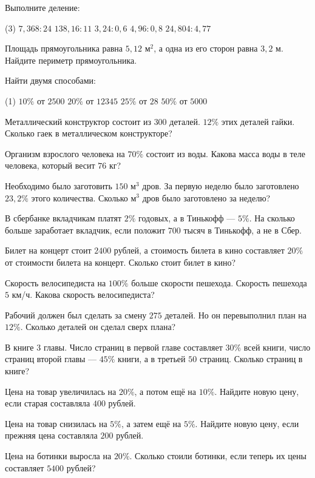 \begin{class}[number=3]
	\begin{listofex}
		\item Выполните деление:
		\begin{tasks}(3)
			\task \( 7,368: 24 \)
			\task \( 138,16:11 \) 
			\task \( 3,24:0,6 \)
			\task \( 4,96 : 0,8 \)
			\task \( 24,804 : 4,77 \) 
		\end{tasks}
		\item Площадь прямоугольника равна \( 5,12 \) м\( ^{2} \), а одна из его сторон равна \( 3,2 \) м. Найдите периметр прямоугольника.
		\item Найти двумя способами:
		\begin{tasks}(1)
			\task \( 10\% \) от \( 2500 \)
			\task \( 20\% \) от \( 12345 \)
			\task \( 25\% \) от \( 28 \)
			\task \( 50\% \) от \( 5000 \)
		\end{tasks}
		\item Металлический конструктор состоит из \( 300 \) деталей. \( 12\% \) этих деталей гайки. Сколько гаек в металлическом конструкторе?
		\item Организм взрослого человека на \( 70\% \) состоит из воды. Какова масса воды в теле человека, который весит \( 76 \) кг?
		\item Необходимо было заготовить \( 150 \) м\( ^3 \) дров. За первую неделю было заготовлено \( 23,2\% \) этого количества. Сколько м\( ^3 \) дров было заготовлено за неделю?
		\item В сбербанке вкладчикам платят \( 2\% \) годовых, а в Тинькофф --- \( 5\% \). На сколько больше заработает вкладчик, если положит \( 700 \) тысяч в Тинькофф, а не в Сбер.
		\item Билет на концерт стоит \( 2400 \) рублей, а стоимость билета в кино составляет \( 20\% \) от стоимости билета на концерт. Сколько стоит билет в кино?
		\item Скорость велосипедиста на \( 100\% \) больше скорости пешехода. Скорость пешехода \( 5 \) км/ч. Какова скорость велосипедиста?
		\item Рабочий должен был сделать за смену \( 275 \) деталей. Но он перевыполнил план на \( 12\% \). Сколько деталей он сделал сверх плана?
		\item В книге \( 3 \) главы. Число страниц в первой главе составляет \( 30\% \) всей книги, число страниц второй главы --- \( 45\% \) книги, а в третьей \( 50 \) страниц. Сколько страниц в книге?
		\item  Цена на товар увеличилась на \( 20\% \), а потом ещё на \( 10\% \). Найдите новую цену, если старая составляла \( 400 \) рублей.
		\item  Цена на товар снизилась на \( 5\% \), а затем ещё на \( 5\% \). Найдите новую цену, если прежняя цена составляла \( 200 \) рублей.
		\item Цена на ботинки выросла на \( 20\% \). Сколько стоили ботинки, если теперь их цены составляет \( 5400 \) рублей?
	\end{listofex}
\end{class}

